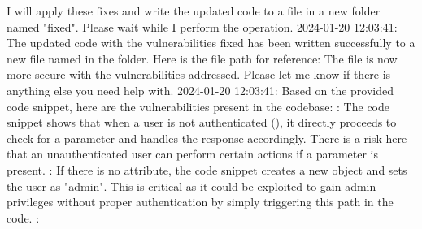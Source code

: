 \markdownRendererUlEndTight \markdownRendererInterblockSeparator
{}I will apply these fixes and write the updated code to a file in a new folder named "fixed". Please wait while I perform the operation. \markdownRendererInterblockSeparator
{}2024-01-20 12:03:41: The updated code with the vulnerabilities fixed has been written successfully to a new file named  in the  folder. Here is the file path for reference:\markdownRendererInterblockSeparator
{}\markdownRendererInterblockSeparator
{}The file is now more secure with the vulnerabilities addressed. Please let me know if there is anything else you need help with. 2024-01-20 12:03:41: Based on the provided code snippet, here are the vulnerabilities present in the codebase:\markdownRendererInterblockSeparator
{}\markdownRendererOlBeginTight
{}:\markdownRendererOlItemEnd 
\markdownRendererOlEndTight \markdownRendererInterblockSeparator
{}\markdownRendererUlBeginTight
\markdownRendererUlItem The code snippet shows that when a user is not authenticated (), it directly proceeds to check for a  parameter and handles the response accordingly. There is a risk here that an unauthenticated user can perform certain actions if a  parameter is present.\markdownRendererUlItemEnd 
\markdownRendererUlEndTight \markdownRendererInterblockSeparator
{}\markdownRendererOlBeginTight
{}:\markdownRendererOlItemEnd 
\markdownRendererOlEndTight \markdownRendererInterblockSeparator
{}\markdownRendererUlBeginTight
\markdownRendererUlItem If there is no  attribute, the code snippet creates a new  object and sets the user as "admin". This is critical as it could be exploited to gain admin privileges without proper authentication by simply triggering this path in the code.\markdownRendererUlItemEnd 
\markdownRendererUlEndTight \markdownRendererInterblockSeparator
{}\markdownRendererOlBeginTight
{}:\markdownRendererOlItemEnd 
